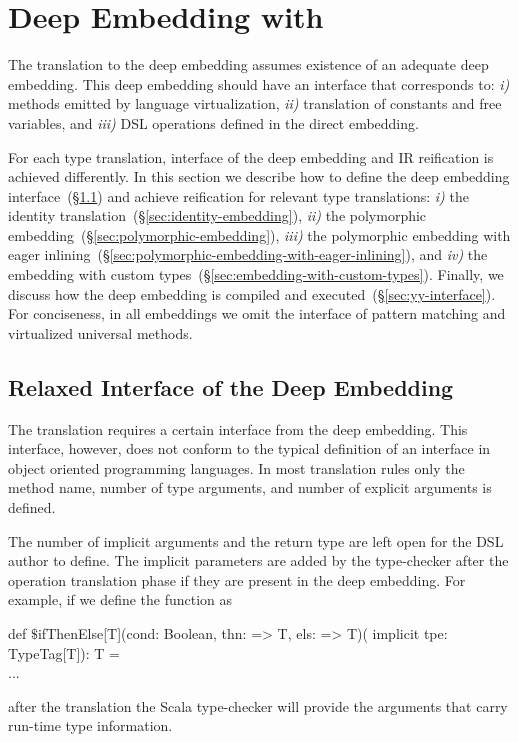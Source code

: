 \chapter{Deep Embedding with \yy}
\label{sec:deep-embedding-implementations}

The translation to the deep embedding assumes existence of an adequate deep embedding. This deep embedding
should have an interface that corresponds to: \emph{i)} methods emitted by language virtualization,
\emph{ii)} translation of constants and free variables, and \emph{iii)} DSL operations defined in
 the direct embedding.

 For each type translation, interface of the deep embedding and IR reification is
  achieved differently. In this section we describe
  how to define the deep embedding interface~(\S \ref{sec:relaxed-interface}) and achieve reification
  for relevant type translations:
   \emph{i)} the identity translation~(\S \ref{sec:identity-embedding}),
   \emph{ii)} the polymorphic embedding~(\S \ref{sec:polymorphic-embedding}),
   \emph{iii)} the polymorphic embedding with eager inlining~(\S \ref{sec:polymorphic-embedding-with-eager-inlining}), and
   \emph{iv)} the embedding with custom types~(\S \ref{sec:embedding-with-custom-types}).
  Finally, we discuss how the deep embedding is compiled and executed~(\S \ref{sec:yy-interface}). For conciseness,
   in all embeddings we omit the interface of pattern matching and virtualized universal methods.

\section{Relaxed Interface of the Deep Embedding}
\label{sec:relaxed-interface}

The \yy translation requires a certain interface from the deep embedding. This interface, however,
 does not conform to the typical definition of an interface in object oriented programming languages.
 In most translation rules only the method name, number of type arguments, and number
 of explicit arguments is defined.

The number of implicit arguments and the return type are left open for
 the DSL author to define. The implicit parameters are added by the type-checker
 after the operation translation phase if they are present in the deep embedding.
 For example, if we define the  function as\begin{lstparagraph}
def $\$$ifThenElse[T](cond: Boolean, thn: => T, els: => T)(
  implicit tpe: TypeTag[T]): T = \\...
\end{lstparagraph}
after the translation the Scala type-checker will provide the arguments that
carry run-time type information.

